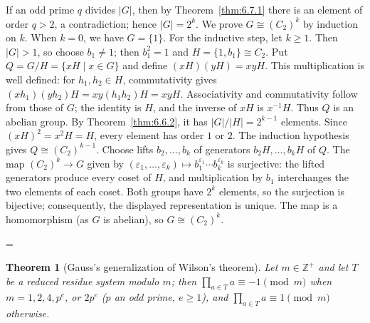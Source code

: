 \documentclass[11pt]{article}
\makeatletter
\theoremstyle{ntstyle}
\newtheorem{theorem}{Theorem}[subsection]
\let\nt@closedisplay\]
\def\nt@guardedclose{\@ifnextchar\par{\nt@closeafterpar}{\@ifnextchar\end{\postdisplaypenalty\@M\nt@closedisplay}{\nt@closedisplay}}}
\def\nt@closeafterpar\par{\@ifnextchar\par{\nt@closeafterpar}{\@ifnextchar\end{\postdisplaypenalty\@M\nt@closedisplay\par}{\nt@closedisplay\par}}}
\renewenvironment{proof}[1][\proofname]{\par
  \pushQED{\qed}\normalfont\topsep\medskipamount\edef\nt@afterproof{\@endparpenalty=\the\@endparpenalty\relax}\@beginparpenalty\@M\@endparpenalty\@M\let\]\nt@guardedclose\trivlist\item[]\textit{#1\@addpunct{.}} \ignorespaces}{\ifvmode\addpenalty\@M\fi\popQED\nt@afterproof\endtrivlist\@endpefalse}
\makeatother
\begin{document}
\begin{proof} If an odd prime $q$ divides $|G|$, then by
	Theorem~\ref{thm:6.7.1} there is an element of order $q > 2$, a contradiction;
	hence $|G| = 2^{k}$. We prove $G \cong (C_2)^{k}$ by induction on
	$k$. When $k = 0$, we have $G = \{1\}$. For the inductive step, let
	$k\ge1$. Then $|G|>1$, so choose $b_1\neq
		1$; then $b_1^2=1$ and $H = \{1, b_1\} \cong C_2$. Put
	$Q=G/H=\{xH\mid x\in G\}$ and define $(xH)(yH)=xyH$.
	This multiplication is well defined: for $h_1,h_2\in H$, commutativity gives
	$(xh_1)(yh_2)H=xy(h_1h_2)H=xyH$.
	Associativity and commutativity follow from those of $G$; the identity is
	$H$, and the inverse of $xH$ is $x^{-1}H$. Thus $Q$ is an abelian group.
	By Theorem~\ref{thm:6.6.2}, it has $|G|/|H|=2^{k-1}$ elements.
	Since $(xH)^2=x^2H=H$, every element has order $1$ or $2$.
	The induction hypothesis gives $Q\cong(C_2)^{k-1}$.
	  Choose lifts $b_2,\ldots,b_k$ of generators $b_2H,\ldots,b_kH$ of $Q$.
	  The map $(C_2)^k\to G$ given by $(\varepsilon_1,\ldots,\varepsilon_k)\mapsto b_1^{\varepsilon_1}\cdots b_k^{\varepsilon_k}$ is surjective: the lifted generators produce every coset of $H$, and multiplication by $b_1$ interchanges the two elements of each coset.
	  Both groups have $2^k$ elements, so the surjection is bijective; consequently, the displayed representation is unique.
	  The map is a homomorphism (as $G$ is
	abelian), so $G \cong (C_2)^{k}$.

\end{proof}
\begin{theorem}[Gauss's generalization of Wilson's theorem]\label{thm:6.7.3} Let $m\in\mathbb{Z}^+$ and let $T$ be a reduced residue system modulo $m$; then
	$\prod_{a \in T} a \equiv -1 \pmod{m}$ when $m = 1, 2, 4, p^{e}$, or $2
		p^{e}$ ($p$ an odd prime, $e \ge 1$), and $\prod_{a \in T} a \equiv 1 \pmod{m}$ otherwise.

\end{theorem}
\end{document}
